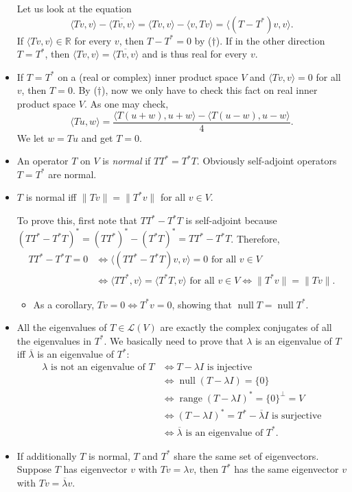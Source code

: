 \documentclass{article}
\newcommand{\R}{\mathbb{R}}
\newcommand{\n}{\operatorname{null}}
\renewcommand{\r}{\operatorname{range}}
\newcommand{\conj}[1]{\overline{#1}}
\newcommand{\inp}[2]{\langle #1, #2 \rangle}
\newcommand{\nm}[1]{\| #1 \|}
\newcommand{\LV}{\mathcal{L}(V)}
\begin{document}
\begin{itemize}
    Let us look at the equation
    $$\inp{Tv}{v}-\conj{\inp{Tv}{v}}=\inp{Tv}{v}-\inp{v}{Tv}=\inp{(T-T^*)v}{v}.$$ If $\inp{Tv}{v} \in \R$ for every $v$, then $T-T^*=0$ by ($\dagger$). If in the other direction $T=T^*$, then $\inp{Tv}{v}=\conj{\inp{Tv}{v}}$ and is thus real for every $v$.
    \item If $T = T^*$ on a (real or complex) inner product space $V$ and $\inp{Tv}{v}=0$ for all $v$, then $T = 0$. By ($\dagger$), now we only have to check this fact on real inner product space $V$. As one may check, $$\inp{Tu}{w} = \frac{\inp{T(u+w)}{u+w}-\inp{T(u-w)}{u-w}}{4}.$$ We let $w = Tu$ and get $T = 0$.
    \item An operator $T$ on $V$ is \textit{normal} if $TT^* = T^*T$. Obviously self-adjoint operators $T = T^*$ are normal.
    \item $T$ is normal iff $\nm{Tv}=\nm{T^*v}$ for all $v \in V$.
    
    To prove this, first note that $TT^* - T^*T$ is self-adjoint because $(TT^*-T^*T)^*=(TT^*)^*-(T^*T)^*=TT^* - T^*T$. Therefore,
    \begin{align*}
        TT^*-T^*T=0 & \iff \inp{(TT^*-T^*T)v}{v}=0 \text{ for all } v \in V \\ & \iff \inp{TT^*}{v} = \inp{T^*T}{v} \text{ for all } v \in V \iff \nm{T^*v}=\nm{Tv}.
    \end{align*}
    \begin{itemize}
        \item As a corollary, $Tv = 0 \iff T^*v = 0$, showing that $\n T = \n T^*$.
    \end{itemize}
    \item All the eigenvalues of $T \in \LV$ are exactly the complex conjugates of all the eigenvalues in $T^*$. We basically need to prove that $\lambda$ is an eigenvalue of $T$ iff $\conj{\lambda}$ is an eigenvalue of $T^*$:
    \begin{align*}
        \lambda \text{ is not an eigenvalue of } T & \iff T - \lambda I \text{ is injective} \\ & \iff \n (T-\lambda I) = \{0\} \\ & \iff \r (T-\lambda I)^* = \{0\}^\perp = V \\ & \iff (T-\lambda I)^* = T^* - \conj{\lambda} I \text{ is surjective} \\ & \iff \conj{\lambda} \text{ is an eigenvalue of $T^*$}.
    \end{align*}
    \item If additionally $T$ is normal, $T$ and $T^*$ share the same set of eigenvectors. Suppose $T$ has eigenvector $v$ with $Tv = \lambda v$, then $T^*$ has the same eigenvector $v$ with $Tv = \conj{\lambda}v$.
    

\end{itemize}
\end{document}
